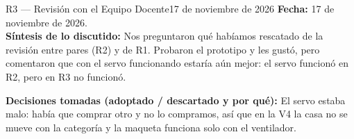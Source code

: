 \documentclass[11pt,a4paper]{article}
\begin{document}
	\vspace{0.4cm}

	\begin{revisionbox}{R3 — Revisión con el Equipo Docente}{17 de noviembre de 2026}
		\noindent\textbf{Fecha:} 17 de noviembre de 2026.\\
		\textbf{Síntesis de lo discutido:} Nos preguntaron qué habíamos rescatado de la revisión entre pares (R2) y de R1. Probaron el prototipo y les gustó, pero comentaron que con el servo funcionando estaría aún mejor: el servo funcionó en R2, pero en R3 no funcionó.

		\vspace{0.15cm}
		\noindent\textbf{Decisiones tomadas (adoptado / descartado y por qué):}
		El servo estaba malo: había que comprar otro y no lo compramos, así que en la V4 la casa no se mueve con la categoría y la maqueta funciona solo con el ventilador.
	\end{revisionbox}

	\vspace{0.4cm}
\end{document}
